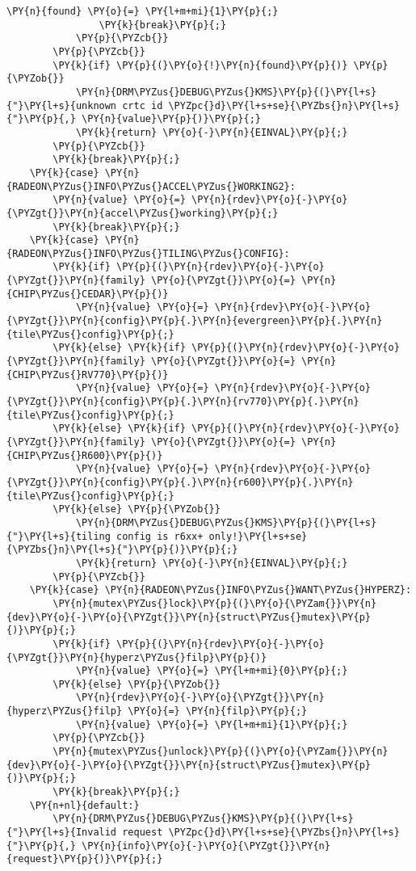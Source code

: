 \begin{Verbatim}[commandchars=\\\{\}]
				\PY{n}{found} \PY{o}{=} \PY{l+m+mi}{1}\PY{p}{;}
				\PY{k}{break}\PY{p}{;}
			\PY{p}{\PYZcb{}}
		\PY{p}{\PYZcb{}}
		\PY{k}{if} \PY{p}{(}\PY{o}{!}\PY{n}{found}\PY{p}{)} \PY{p}{\PYZob{}}
			\PY{n}{DRM\PYZus{}DEBUG\PYZus{}KMS}\PY{p}{(}\PY{l+s}{"}\PY{l+s}{unknown crtc id \PYZpc{}d}\PY{l+s+se}{\PYZbs{}n}\PY{l+s}{"}\PY{p}{,} \PY{n}{value}\PY{p}{)}\PY{p}{;}
			\PY{k}{return} \PY{o}{-}\PY{n}{EINVAL}\PY{p}{;}
		\PY{p}{\PYZcb{}}
		\PY{k}{break}\PY{p}{;}
	\PY{k}{case} \PY{n}{RADEON\PYZus{}INFO\PYZus{}ACCEL\PYZus{}WORKING2}:
		\PY{n}{value} \PY{o}{=} \PY{n}{rdev}\PY{o}{-}\PY{o}{\PYZgt{}}\PY{n}{accel\PYZus{}working}\PY{p}{;}
		\PY{k}{break}\PY{p}{;}
	\PY{k}{case} \PY{n}{RADEON\PYZus{}INFO\PYZus{}TILING\PYZus{}CONFIG}:
		\PY{k}{if} \PY{p}{(}\PY{n}{rdev}\PY{o}{-}\PY{o}{\PYZgt{}}\PY{n}{family} \PY{o}{\PYZgt{}}\PY{o}{=} \PY{n}{CHIP\PYZus{}CEDAR}\PY{p}{)}
			\PY{n}{value} \PY{o}{=} \PY{n}{rdev}\PY{o}{-}\PY{o}{\PYZgt{}}\PY{n}{config}\PY{p}{.}\PY{n}{evergreen}\PY{p}{.}\PY{n}{tile\PYZus{}config}\PY{p}{;}
		\PY{k}{else} \PY{k}{if} \PY{p}{(}\PY{n}{rdev}\PY{o}{-}\PY{o}{\PYZgt{}}\PY{n}{family} \PY{o}{\PYZgt{}}\PY{o}{=} \PY{n}{CHIP\PYZus{}RV770}\PY{p}{)}
			\PY{n}{value} \PY{o}{=} \PY{n}{rdev}\PY{o}{-}\PY{o}{\PYZgt{}}\PY{n}{config}\PY{p}{.}\PY{n}{rv770}\PY{p}{.}\PY{n}{tile\PYZus{}config}\PY{p}{;}
		\PY{k}{else} \PY{k}{if} \PY{p}{(}\PY{n}{rdev}\PY{o}{-}\PY{o}{\PYZgt{}}\PY{n}{family} \PY{o}{\PYZgt{}}\PY{o}{=} \PY{n}{CHIP\PYZus{}R600}\PY{p}{)}
			\PY{n}{value} \PY{o}{=} \PY{n}{rdev}\PY{o}{-}\PY{o}{\PYZgt{}}\PY{n}{config}\PY{p}{.}\PY{n}{r600}\PY{p}{.}\PY{n}{tile\PYZus{}config}\PY{p}{;}
		\PY{k}{else} \PY{p}{\PYZob{}}
			\PY{n}{DRM\PYZus{}DEBUG\PYZus{}KMS}\PY{p}{(}\PY{l+s}{"}\PY{l+s}{tiling config is r6xx+ only!}\PY{l+s+se}{\PYZbs{}n}\PY{l+s}{"}\PY{p}{)}\PY{p}{;}
			\PY{k}{return} \PY{o}{-}\PY{n}{EINVAL}\PY{p}{;}
		\PY{p}{\PYZcb{}}
	\PY{k}{case} \PY{n}{RADEON\PYZus{}INFO\PYZus{}WANT\PYZus{}HYPERZ}:
		\PY{n}{mutex\PYZus{}lock}\PY{p}{(}\PY{o}{\PYZam{}}\PY{n}{dev}\PY{o}{-}\PY{o}{\PYZgt{}}\PY{n}{struct\PYZus{}mutex}\PY{p}{)}\PY{p}{;}
		\PY{k}{if} \PY{p}{(}\PY{n}{rdev}\PY{o}{-}\PY{o}{\PYZgt{}}\PY{n}{hyperz\PYZus{}filp}\PY{p}{)}
			\PY{n}{value} \PY{o}{=} \PY{l+m+mi}{0}\PY{p}{;}
		\PY{k}{else} \PY{p}{\PYZob{}}
			\PY{n}{rdev}\PY{o}{-}\PY{o}{\PYZgt{}}\PY{n}{hyperz\PYZus{}filp} \PY{o}{=} \PY{n}{filp}\PY{p}{;}
			\PY{n}{value} \PY{o}{=} \PY{l+m+mi}{1}\PY{p}{;}
		\PY{p}{\PYZcb{}}
		\PY{n}{mutex\PYZus{}unlock}\PY{p}{(}\PY{o}{\PYZam{}}\PY{n}{dev}\PY{o}{-}\PY{o}{\PYZgt{}}\PY{n}{struct\PYZus{}mutex}\PY{p}{)}\PY{p}{;}
		\PY{k}{break}\PY{p}{;}
	\PY{n+nl}{default:}
		\PY{n}{DRM\PYZus{}DEBUG\PYZus{}KMS}\PY{p}{(}\PY{l+s}{"}\PY{l+s}{Invalid request \PYZpc{}d}\PY{l+s+se}{\PYZbs{}n}\PY{l+s}{"}\PY{p}{,} \PY{n}{info}\PY{o}{-}\PY{o}{\PYZgt{}}\PY{n}{request}\PY{p}{)}\PY{p}{;}

\end{Verbatim}
